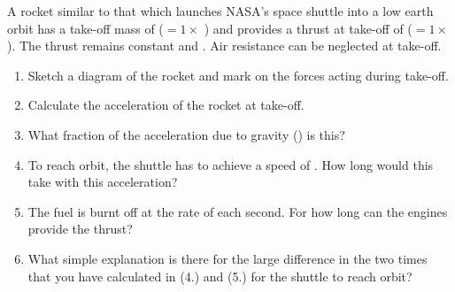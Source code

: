 
\begin{problem}[Robin8]
{A rocket similar to that which launches NASA’s space shuttle into a low earth orbit has a take-off mass of  ($ =  1\times$ ) and provides a thrust at take-off of  ($ = 1\times$). The thrust remains constant and .  Air resistance can be neglected at take-off. 
\begin{enumerate}
	\item Sketch a diagram of the rocket and mark on the forces acting during take-off.
	\item Calculate the acceleration of the rocket at take-off.
	\item What fraction of the acceleration due to gravity () is this?
	\item To reach orbit, the shuttle has to achieve a speed of .  How long would this take with this acceleration?
	\item The fuel is burnt off at the rate of  each second.  For how long can the engines provide the thrust?
	\item What simple explanation is there for the large difference in the two times that you have calculated in (4.) and (5.) for the shuttle to reach orbit?
\end{enumerate}
}
{}
{}
\end{problem}